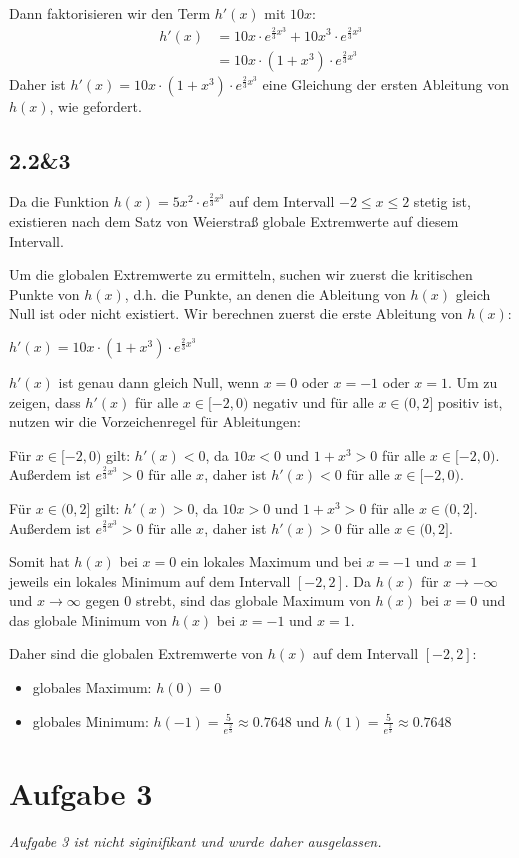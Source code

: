 \documentclass{article}
\begin{document}
Dann faktorisieren wir den Term $h'(x)$ mit $10x$:
\begin{align*}
  h'(x) &= 10x \cdot e^{\frac{2}{3} x^3} + 10x^3 \cdot e^{\frac{2}{3} x^3}\\
        &= 10x \cdot (1 + x^3) \cdot e^{\frac{2}{3} x^3}
\end{align*}
Daher ist $h'(x) = 10x \cdot (1+x^3) \cdot e^{\frac{2}{3} x^3}$ eine Gleichung
der ersten Ableitung von $h(x)$, wie gefordert.

\subsection*{2.2\&3}
Da die Funktion $h(x) = 5x^2 \cdot e^{\frac{2}{3} x^3}$ auf dem Intervall $-2
\leq x \leq 2$ stetig ist, existieren nach dem Satz von Weierstraß globale
Extremwerte auf diesem Intervall.

Um die globalen Extremwerte zu ermitteln, suchen wir zuerst die kritischen
Punkte von $h(x)$, d.h. die Punkte, an denen die Ableitung von $h(x)$ gleich
Null ist oder nicht existiert. Wir berechnen zuerst die erste Ableitung von
$h(x)$:

$h'(x) = 10x \cdot (1+x^3) \cdot e^{\frac{2}{3} x^3}$

$h'(x)$ ist genau dann gleich Null, wenn $x=0$ oder $x=-1$ oder $x=1$. Um zu
zeigen, dass $h'(x)$ für alle $x \in [-2,0)$ negativ und für alle $x \in (0,2]$
positiv ist, nutzen wir die Vorzeichenregel für Ableitungen:

Für $x \in [-2,0)$ gilt: $h'(x) < 0$, da $10x < 0$ und $1+x^3 > 0$ für alle $x
\in [-2,0)$. Außerdem ist $e^{\frac{2}{3} x^3} > 0$ für alle $x$, daher ist
$h'(x) < 0$ für alle $x \in [-2,0)$.

Für $x \in (0,2]$ gilt: $h'(x) > 0$, da $10x > 0$ und $1+x^3 > 0$ für alle $x
\in (0,2]$. Außerdem ist $e^{\frac{2}{3} x^3} > 0$ für alle $x$, daher ist
$h'(x) > 0$ für alle $x \in (0,2]$.

Somit hat $h(x)$ bei $x=0$ ein lokales Maximum und bei $x=-1$ und $x=1$ jeweils
ein lokales Minimum auf dem Intervall $[-2,2]$. Da $h(x)$ für $x \rightarrow
-\infty$ und $x \rightarrow \infty$ gegen $0$ strebt, sind das globale Maximum
von $h(x)$ bei $x=0$ und das globale Minimum von $h(x)$ bei $x=-1$ und $x=1$.

Daher sind die globalen Extremwerte von $h(x)$ auf dem Intervall $[-2,2]$:
\begin{itemize}
  \item globales Maximum: $h(0) = 0$
  \item globales Minimum: $h(-1) = \frac{5}{e^{\frac{2}{3}}} \approx 0.7648$ und $h(1) = \frac{5}{e^{\frac{2}{3}}} \approx 0.7648$
\end{itemize}


\section*{Aufgabe 3}
\textit{Aufgabe 3 ist nicht siginifikant und wurde daher ausgelassen.}
\end{document}
